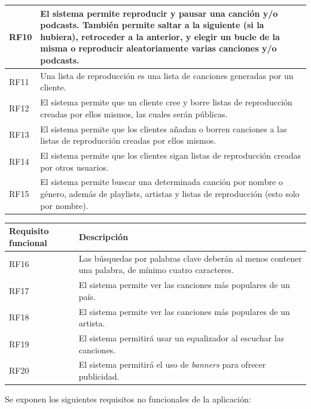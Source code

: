 \documentclass{article}
\begin{document}
\begin{table}[H]
\begin{tabular}{p{4cm} p{10cm}}
		\hline
		RF10
		& El sistema permite reproducir y pausar una canción y/o podcasts. También permite saltar a la siguiente (si la hubiera), retroceder a la anterior, y elegir un bucle de la misma o reproducir aleatoriamente varias canciones y/o podcasts. \\ 
		\hline
		RF11
		& Una lista de reproducción es una lista de canciones generadas por un cliente. \\ 
		\hline
		RF12
		& El sistema permite que un cliente cree y borre listas de reproducción creadas por ellos mismos, las cuales serán públicas. \\ 
		\hline
		RF13
		& El sistema permite que los clientes añadan o borren canciones a las listas de reproducción creadas por ellos mismos. \\ 
		\hline
		RF14
		& El sistema permite que los clientes sigan listas de reproducción creadas por otros usuarios. \\ 
		\hline
		RF15
		& El sistema permite buscar una determinada canción por nombre o género, además de playlists, artistas y listas de reproducción (esto solo por nombre). \\
		\hline
	\end{tabular}
\end{table}
\break
\begin{table}[H]
	\begin{tabular}{p{4cm} p{10cm}}
		\hline
		\hline 
		\textbf{Requisito funcional}
		\vspace{0.5mm} & \textbf{Descripción} \\ 
		\hline
		\hline
		RF16
		& Las búsquedas por palabras clave deberán al menos contener una palabra, de mínimo cuatro caracteres. \\ 
		\hline 
		RF17
		& El sistema permite ver las canciones más populares de un país. \\ 
		\hline 
		RF18
		& El sistema permite ver las canciones más populares de un artista. \\ 
		\hline
		RF19
		& El sistema permitirá usar un equalizador al escuchar las canciones. \\ 
		\hline
		RF20
		& El sistema permitirá el uso de \textit{banners} para ofrecer publicidad. \\ 
		\hline
	\end{tabular}
\end{table}
Se exponen los siguientes requisitos no funcionales de la aplicación:
\end{document}
